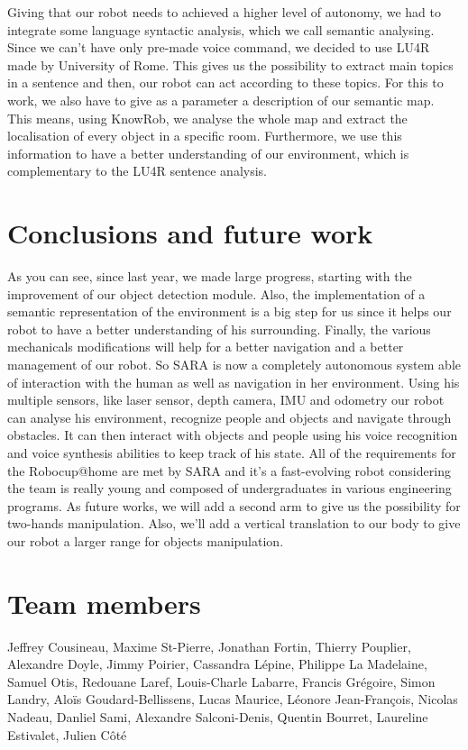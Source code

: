 \documentclass[runningheads,a4paper]{llncs}
\begin{document}
Giving that our robot needs to achieved a higher level of autonomy, we had to integrate some language syntactic analysis, which we call semantic analysing. Since we can't have only pre-made voice command, we decided to use LU4R \cite{lu4r} made by University of Rome. This gives us the possibility to extract main topics in a sentence and then, our robot can act according to these topics. For this to work, we also have to give as a parameter a description of our semantic map. This means, using KnowRob, we analyse the whole map and extract the localisation of every object in a specific room. Furthermore, we use this information to have a better understanding of our environment, which is complementary to the LU4R sentence analysis.


\section{Conclusions and future work}
\tab As you can see, since last year, we made large progress, starting with the improvement of our object detection module. Also, the implementation of a semantic representation of the environment is a big step for us since it helps our robot to have a better understanding of his surrounding. Finally, the various mechanicals modifications will help for a better navigation and a better management of our robot. So SARA is now a completely autonomous system able of interaction with the human as well as navigation in her environment. Using his multiple sensors, like laser sensor, depth camera, IMU and odometry our robot can analyse his environment, recognize people and objects and navigate through obstacles. It can then interact with objects and people using his voice recognition and voice synthesis abilities to keep track of his state. All of the requirements for the Robocup@home are met by SARA and it's a fast-evolving robot considering the team is really young and composed of undergraduates in various engineering programs. As future works, we will add a second arm to give us the possibility for two-hands manipulation. Also, we'll add a vertical translation to our body to give our robot a larger range for objects manipulation.


	

\section*{Team members}
Jeffrey Cousineau, Maxime St-Pierre, Jonathan Fortin, Thierry Pouplier, Alexandre Doyle, Jimmy Poirier, Cassandra Lépine, Philippe La Madelaine, Samuel Otis, Redouane Laref, Louis-Charle Labarre, Francis Grégoire, Simon Landry, Aloïs Goudard-Bellissens, Lucas Maurice, Léonore Jean-François, Nicolas Nadeau, Danliel Sami, Alexandre Salconi-Denis, Quentin Bourret, Laureline Estivalet, Julien Côté 

\nocite{*}


\end{document}

